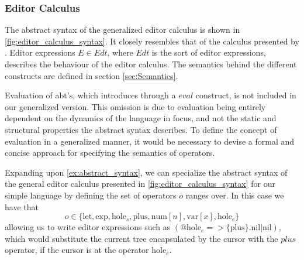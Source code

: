 \documentclass[sigplan,screen]{acmart}
\begin{document}
\subsubsection{Editor Calculus}
The abstract syntax of the generalized editor calculus is shown in \cref{fig:editor_calculus_syntax}. It closely resembles that of the calculus presented by \cite{type_safe_structure_editor}.
Editor expressions $E \in Edt$, where $Edt$ is the sort of editor expressions, describes the behaviour of the editor calculus. The semantics behind the different constructs are defined in section \cref{sec:Semantics}.

Evaluation of abt's, which \cite{type_safe_structure_editor} introduces through a $eval$ construct, is not included in our generalized version. This omission is due to evaluation being entirely dependent on the dynamics of the language in focus, and not the static and structural properties the abstract syntax describes. To define the concept of evaluation in a generalized manner, it would be necessary to devise a formal and concise approach for specifying the semantics of operators.

\begin{example}\label{ex:editor_calculus}
    Expanding upon \cref{ex:abstract_syntax}, we can specialize the abstract syntax of the general editor calculus presented in \cref{fig:editor_calculus_syntax} for our simple language by defining the set of operators $o$ ranges over. In this case we have that
    \begin{equation*}
        o \in \{ \text{let}, \text{exp}, \text{hole}_s, \text{plus}, \text{num}[n], \text{var}[x], \text{hole}_e \}
    \end{equation*}
    allowing us to write editor expressions such as $(@\text{hole}_e => \{\text{plus}\}.\text{nil}|\text{nil})$, which would substitute the current tree encapsulated by the cursor with the $plus$ operator, if the cursor is at the operator $\text{hole}_e$.
\end{example}
\end{document}
